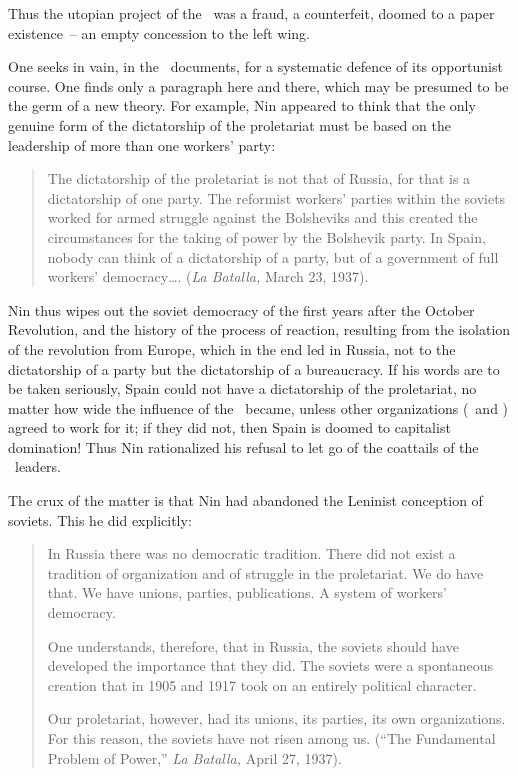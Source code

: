Thus the utopian project of the \POUM\ was a fraud, a counterfeit, doomed to a paper existence~-- an empty concession to the left wing.

One seeks in vain, in the \POUM\ documents, for a systematic defence of its opportunist course. One finds only a paragraph here and there, which may be presumed to be the germ of a new theory. For example, Nin appeared to think that the only genuine form of the dictatorship of the proletariat must be based on the leadership of more than one workers’ party:

\begin{quotation}
  The dictatorship of the proletariat is not that of Russia, for that is a dictatorship of one party. The reformist workers’ parties within the soviets worked for armed struggle against the Bolsheviks and this created the circumstances for the taking of power by the Bolshevik party. In Spain, nobody can think of a dictatorship of a party, but of a government of full workers’ democracy\dots. (\emph{La Batalla,} March 23, 1937).
\end{quotation}

Nin thus wipes out the soviet democracy of the first years after the October Revolution, and the history of the process of reaction, resulting from the isolation of the revolution from Europe, which in the end led in Russia, not to the dictatorship of a party but the dictatorship of a bureaucracy. If his words are to be taken seriously, Spain could not have a dictatorship of the proletariat, no matter how wide the influence of the \POUM\ became, unless other organizations (\FAI\ and \CNT) agreed to work for it; if they did not, then Spain is doomed to capitalist domination! Thus Nin rationalized his refusal to let go of the coattails of the \CNT\ leaders.

The crux of the matter is that Nin had abandoned the Leninist conception of soviets. This he did explicitly:

\begin{quotation}
  In Russia there was no democratic tradition. There did not exist a tradition of organization and of struggle in the proletariat. We do have that. We have unions, parties, publications. A system of workers’ democracy.
  
  One understands, therefore, that in Russia, the soviets should have developed the importance that they did. The soviets were a spontaneous creation that in 1905 and 1917 took on an entirely political character.
  
  Our proletariat, however, had its unions, its parties, its own organizations. For this reason, the soviets have not risen among us. (``\kp The Fundamental Problem of Power,\kn'' \emph{La Batalla,} April 27, 1937).
\end{quotation}

